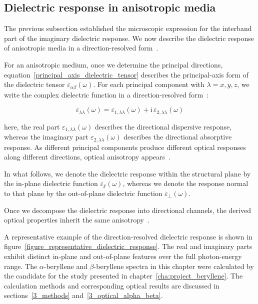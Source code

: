 \subsection{Dielectric response in anisotropic media}

The previous subsection established the microscopic expression for the interband part of the imaginary dielectric response.
We now describe the dielectric response of anisotropic media in a direction-resolved form~\cite{slavich2024exploring}.

For an anisotropic medium, once we determine the principal directions,
equation~\eqref{principal_axis_dielectric_tensor} describes the principal-axis form of the dielectric tensor $\varepsilon_{\alpha\beta}(\omega)$.
For each principal component with $\lambda=x,y,z$, 
we write the complex dielectric function in a direction-resolved form~\cite{nye1985physical}:

\begin{equation}
    \varepsilon_{\lambda\lambda}(\omega) =
    \varepsilon_{1,\lambda\lambda}(\omega)
    + \mathrm{i}\,\varepsilon_{2,\lambda\lambda}(\omega)
\label{direction_resolved_complex_dielectric_function}
\end{equation}

here, the real part $\varepsilon_{1,\lambda\lambda}(\omega)$ describes the directional dispersive response,
whereas the imaginary part $\varepsilon_{2,\lambda\lambda}(\omega)$ describes the directional absorptive response.
As different principal components produce different optical responses along different directions, 
optical anisotropy appears~\cite{nye1985physical}.

In what follows,
we denote the dielectric response within the structural plane by the in-plane dielectric function $\varepsilon_{\varparallel}(\omega)$,
whereas we denote the response normal to that plane by
the out-of-plane dielectric function $\varepsilon_{\perp}(\omega)$.

Once we decompose the dielectric response into directional channels,
the derived optical properties inherit the same anisotropy~\cite{alonso2004optical}.

A representative example of the direction-resolved dielectric response is shown in figure~\ref{figure_representative_dielectric_response}.
The real and imaginary parts exhibit distinct in-plane and out-of-plane features over the full photon-energy range.
The $\alpha$-beryllene and $\beta$-beryllene spectra in this chapter were calculated by the candidate for the study presented in chapter~\ref{cha:project_beryllene}.
The calculation methods and corresponding optical results are discussed in sections~\ref{3_methods} and~\ref{3_optical_alpha_beta}.

